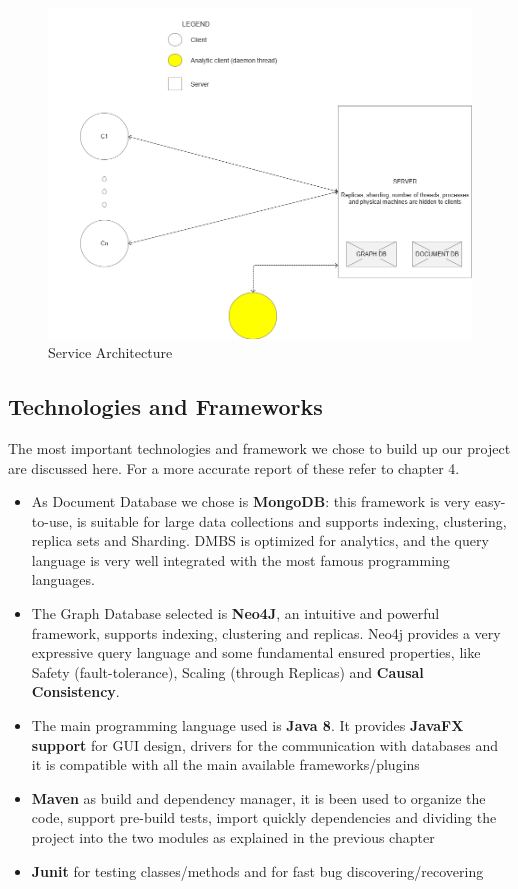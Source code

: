 \begin{figure}[H]
	\centering
	\includegraphics[width=\textwidth]{img/architecture.png}
	\caption{Service Architecture}
\end{figure}


\subsection{Technologies and Frameworks}
The most important technologies and framework we chose to build up our project are discussed here. For a more accurate report of these refer to chapter 4.
\begin{itemize}
\item As Document Database we chose is \textbf{MongoDB}: this framework is very easy-to-use, is suitable for large data collections and supports indexing, clustering, replica sets and Sharding. DMBS is optimized for analytics, and the query language is very well integrated with the most famous programming languages.
\item The Graph Database selected is \textbf{Neo4J}, an intuitive and powerful framework, supports indexing, clustering and replicas. Neo4j provides a very expressive query language and some fundamental ensured properties, like Safety (fault-tolerance), Scaling (through Replicas) and \textbf{Causal Consistency}.
\item The main programming language used is \textbf{Java 8}. It provides \textbf{JavaFX support} for GUI design, drivers for the communication with databases and it is compatible with all the main available frameworks/plugins
\item \textbf{Maven} as build and dependency manager, it is been used to organize the code, support pre-build tests, import quickly dependencies and dividing the project into the two modules as explained in the previous chapter
\item \textbf{Junit} for testing classes/methods and for fast bug discovering/recovering    
\end{itemize}
